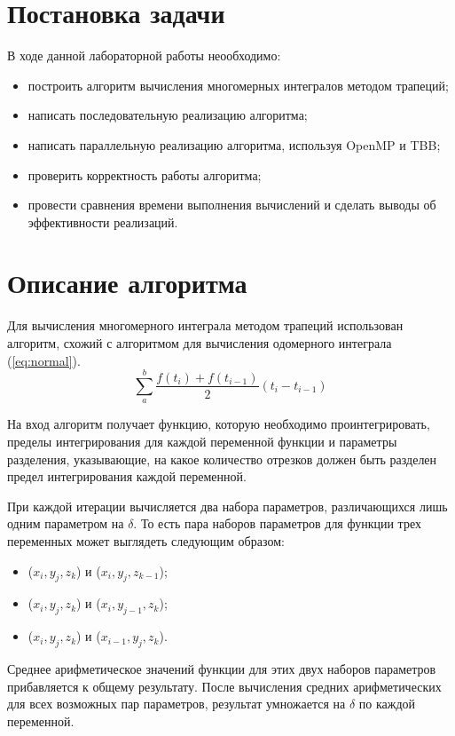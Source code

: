 \documentclass{report}
\begin{document}
    \newpage
    
    \section*{Постановка задачи}
    \par В ходе данной лабораторной работы неообходимо:
    \begin{itemize}
        \item построить алгоритм вычисления многомерных интегралов методом трапеций;
        \item написать последовательную реализацию алгоритма;
        \item написать параллельную реализацию алгоритма, используя OpenMP и TBB;
        \item проверить корректность работы алгоритма;
        \item провести сравнения времени выполнения вычислений и сделать выводы об эффективности реализаций.
    \end{itemize}
    \newpage
    
    \section*{Описание алгоритма}
    \par Для вычисления многомерного интеграла методом трапеций использован алгоритм, схожий с алгоритмом для вычисления одомерного интеграла (\ref{eq:normal}).
    \begin{equation}
        \label{eq:normal}
        \sum^b_a\frac{f(t_i) + f(t_{i-1})}{2}\left(t_i-t_{i-1}\right)
    \end{equation}
    \par На вход алгоритм получает функцию, которую необходимо проинтегрировать, пределы интегрирования для каждой переменной функции и параметры разделения, указывающие, на какое количество отрезков должен быть разделен предел интегрирования каждой переменной.
    \par При каждой итерации вычисляется два набора параметров, различающихся лишь одним параметром на $\delta$. То есть пара наборов параметров для функции трех переменных может выглядеть следующим образом:
    \begin{itemize}
        \item ($x_i, y_j, z_k$) и ($x_i, y_j, z_{k-1}$);
        \item ($x_i, y_j, z_k$) и ($x_i, y_{j-1}, z_k$);
        \item ($x_i, y_j, z_k$) и ($x_{i-1}, y_j, z_k$).
    \end{itemize}
    \par Среднее арифметическое значений функции для этих двух наборов параметров прибавляется к общему результату. После вычисления средних арифметических для всех возможных пар параметров, результат умножается на $\delta$ по каждой переменной.
    \newpage
    
\end{document}
